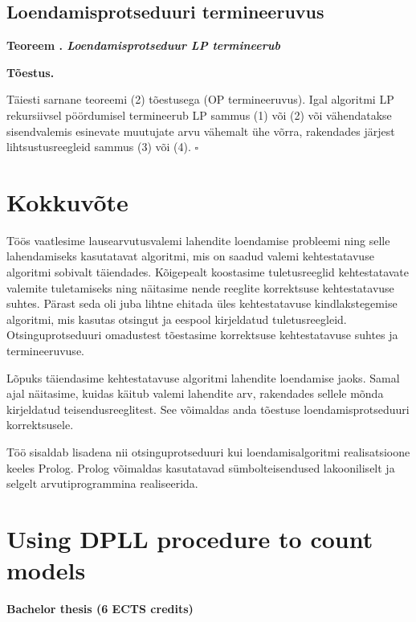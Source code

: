 \documentclass[12pt,estonian]{report}
\newcounter{theorem_counter}\setcounter{theorem_counter}{1}
\newcommand{\theorem}[1]{
	\hspace{1cm}\textbf{Teoreem \arabic{theorem_counter}\stepcounter{theorem_counter}. \textit{#1}}
}
\newcommand{\proof}[0]{
	\hspace{1cm}\textbf{Tõestus.}
}
\newcommand{\proofend}[0]{\(\square\)}
\newcommand{\proc}[1]{\textsf{#1}}
\begin{document}
\section{Loendamisprotseduuri termineeruvus}

\theorem{Loendamisprotseduur \proc{LP} termineerub}

\proof
Täiesti sarnane teoreemi (2) tõestusega (\proc{OP} termineeruvus). Igal algoritmi \proc{LP} rekursiivsel
pöördumisel termineerub \proc{LP} sammus (1) või (2) või vähendatakse sisendvalemis esinevate
muutujate arvu vähemalt ühe võrra, rakendades järjest lihtsustusreegleid sammus (3) või (4). \proofend


 \chapter*{Kokkuvõte}

Töös vaatlesime lausearvutusvalemi lahendite loendamise probleemi ning selle lahendamiseks
kasutatavat algoritmi, mis on saadud valemi kehtestatavuse algoritmi sobivalt täiendades.
Kõigepealt koostasime tuletusreeglid kehtestatavate valemite tuletamiseks ning näitasime
nende reeglite korrektsuse kehtestatavuse suhtes. Pärast seda
oli juba lihtne ehitada üles kehtestatavuse kindlakstegemise algoritmi, mis
kasutas otsingut ja eespool kirjeldatud tuletusreegleid. Otsinguprotseduuri omadustest
tõestasime korrektsuse kehtestatavuse suhtes ja termineeruvuse.

Lõpuks täiendasime kehtestatavuse algoritmi lahendite loendamise jaoks. Samal
ajal näitasime, kuidas käitub valemi lahendite arv, rakendades sellele mõnda
kirjeldatud teisendusreeglitest. See võimaldas anda tõestuse
loendamisprotseduuri korrektsusele.

Töö sisaldab lisadena nii otsinguprotseduuri kui loendamisalgoritmi realisatsioone
keeles Prolog. Prolog võimaldas kasutatavad sümbolteisendused lakooniliselt
ja selgelt arvutiprogrammina realiseerida.


\chapter*{Using DPLL procedure to count models}


{\textbf{\Large Bachelor thesis (6 ECTS credits)}}

\vspace{1cm}
\end{document}
